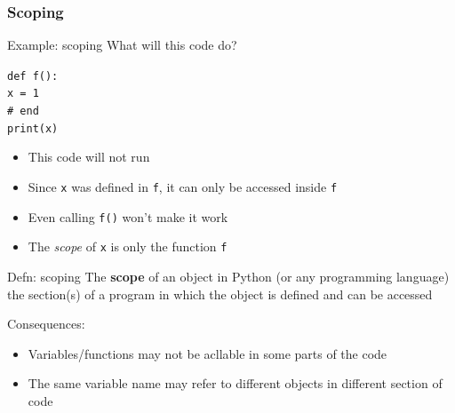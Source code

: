 \documentclass{beamer}
\newcommand{\code}[1]{\texttt{#1}}
\newcommand{\tab}{\hspace*{22pt}}
\begin{document}
\begin{frame}%
	\frametitle{Scoping}
	
	\begin{block}{Example: scoping}
			What will this code do?
			
			\vspace{10pt}
			
			\code{def f():\\[-3pt]
			\tab x = 1 \\[-3pt]
			\#  end \\[6pt]
			print(x)
			}
		\endminipage\hfill
			\begin{itemize}
				\item This code will not run
				\item Since \code{x} was defined in \code{f}, it can only be accessed inside \code{f}
				\item Even calling \code{f()} won't make it work
				\item The \emph{scope} of \code{x} is only the function \code{f}
			\end{itemize}
		\endminipage\hfill
	\end{block}
	
	\begin{alertblock}{Defn: scoping}
		The \textbf{scope} of an object in Python (or any programming language) the section(s) of a program in which the object is defined and can be accessed
		
		\vspace{10pt}
		Consequences:
			\begin{itemize}
				\item Variables/functions may not be acllable in some parts of the code
				\item The same variable name may refer to different objects in different section of code
			\end{itemize}
	\end{alertblock}
	
\end{frame}
\end{document}
